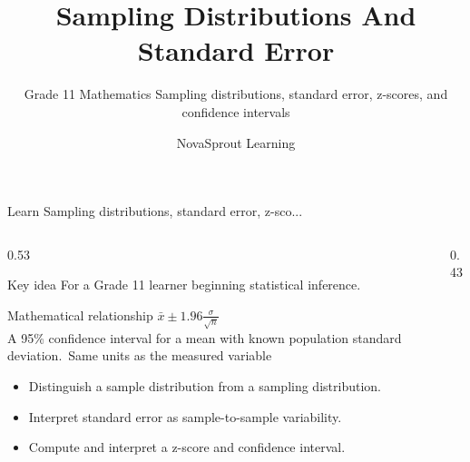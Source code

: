 \documentclass[aspectratio=169]{beamer}
\title{Sampling Distributions And Standard Error}
\subtitle{Grade 11 Mathematics Sampling distributions, standard error, z-scores, and confidence intervals}
\author{NovaSprout Learning}
\date{}
\begin{document}
\begin{frame}{Learn Sampling distributions, standard error, z-sco...}
\begin{columns}[T]
\begin{column}{0.53\textwidth}
\begin{alertblock}{Key idea}
\small For a Grade 11 learner beginning statistical inference.
\end{alertblock}

\begin{block}{Mathematical relationship}
\centering\Large $\bar{x}\pm1.96\frac{\sigma}{\sqrt{n}}$\\[0.12cm]
\small A 95\% confidence interval for a mean with known population standard deviation.\ Same units as the measured variable
\end{block}

\begin{itemize}
\small
\item Distinguish a sample distribution from a sampling distribution.
\item Interpret standard error as sample-to-sample variability.
\item Compute and interpret a z-score and confidence interval.
\end{itemize}
\end{column}
\begin{column}{0.43\textwidth}
\begin{center}\end{center}
\end{column}
\end{columns}

\end{frame}
\end{document}
